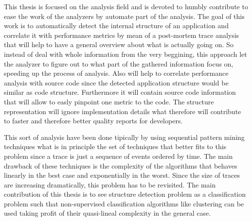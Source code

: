 This thesis is focused on the analysis field and is devoted to humbly contribute 
to ease the work of the analyzers by
automate part of the analysis. The goal of this work is to automatically detect
the internal structure of an application and correlate it with performance metrics by
mean of a post-mortem trace analysis that will help to have a general
overview about what is actually going on. So instead of deal with whole
information from the very beggining, this approach let the analyzer to figure
out to what part of the gathered information focus on, speeding up the process of
analysis. Also will help to correlate performance analysis with source code
since the detected application structure would be similar as
code structure. Furthermore it will contain source code information that will allow to
easly pinpoint one metric to the code. The structure representation will ignore 
implementation details what therefore will contribute to faster and therefore better 
quality reports for developers. 

This sort of analysis have been done tipically by using sequential pattern mining
techniques what is in principle the set of techniques that better fits to this
problem since a trace is just a sequence of events ordered by time. The main
drawback of these techniques is the complexity of the algorithms that behaves
linearly in the best case and exponentially in the worst. Since the size of
traces are increasing dramatically, this problem has to be revisited. 
The main contribution of this thesis is to see structure detection problem as a 
classification problem such that non-supervised classification algorithms like 
clustering can be used taking profit of their quasi-lineal complexity in the 
general case.




